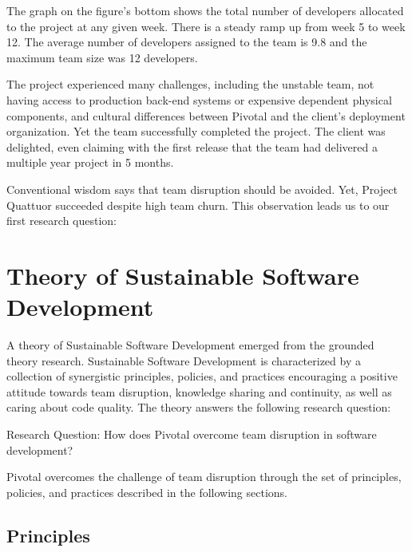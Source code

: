 The graph on the figure's bottom shows the total number of developers allocated to the project at any given week. There is a steady ramp up from week 5 to week 12. The average number of developers assigned to the team is 9.8 and the maximum team size was 12 developers.

The project experienced many challenges, including the unstable team, not having access to production back-end systems or expensive dependent physical components, and cultural differences between Pivotal and the client's deployment organization. Yet the team successfully completed the project. The client was delighted, even claiming with the first release that the team had delivered a multiple year project in 5 months. 

Conventional wisdom says that team disruption should be avoided. Yet, Project Quattuor succeeded despite high team churn. This observation leads us to our first research question: 

\section{Theory of Sustainable Software Development}
\label{Theory}

A theory of Sustainable Software Development emerged from the grounded theory research. Sustainable Software Development is characterized by a collection of synergistic principles, policies, and practices encouraging a positive attitude towards team disruption, knowledge sharing and continuity, as well as caring about code quality. The theory answers the following research question:

Research Question: How does Pivotal overcome team disruption in software development?

Pivotal overcomes the challenge of team disruption through the set of principles, policies, and practices described in the following sections.
\subsection{Principles}

